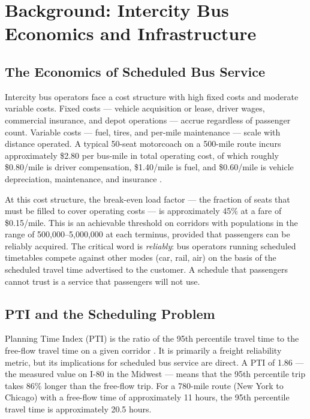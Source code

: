 \section{Background: Intercity Bus Economics and Infrastructure}
\label{sec:background}

\subsection{The Economics of Scheduled Bus Service}

Intercity bus operators face a cost structure with high fixed costs and moderate variable costs. Fixed costs --- vehicle acquisition or lease, driver wages, commercial insurance, and depot operations --- accrue regardless of passenger count. Variable costs --- fuel, tires, and per-mile maintenance --- scale with distance operated. A typical 50-seat motorcoach on a 500-mile route incurs approximately \$2.80 per bus-mile in total operating cost, of which roughly \$0.80/mile is driver compensation, \$1.40/mile is fuel, and \$0.60/mile is vehicle depreciation, maintenance, and insurance \citep{ATRI_costs2024}.

At this cost structure, the break-even load factor --- the fraction of seats that must be filled to cover operating costs --- is approximately 45\% at a fare of \$0.15/mile. This is an achievable threshold on corridors with populations in the range of 500,000--5,000,000 at each terminus, provided that passengers can be reliably acquired. The critical word is \emph{reliably}: bus operators running scheduled timetables compete against other modes (car, rail, air) on the basis of the scheduled travel time advertised to the customer. A schedule that passengers cannot trust is a service that passengers will not use.

\subsection{PTI and the Scheduling Problem}

Planning Time Index (PTI) is the ratio of the 95th percentile travel time to the free-flow travel time on a given corridor \citep{FHWA_freight2023}. It is primarily a freight reliability metric, but its implications for scheduled bus service are direct. A PTI of 1.86 --- the measured value on I-80 in the Midwest \citep{FHWA_freight2023} --- means that the 95th percentile trip takes 86\% longer than the free-flow trip. For a 780-mile route (New York to Chicago) with a free-flow time of approximately 11 hours, the 95th percentile travel time is approximately 20.5 hours.

